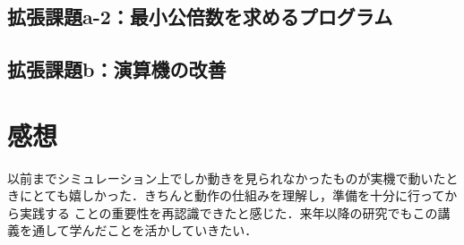 \documentclass[dvipdfmx]{jarticle}
\begin{document}
\subsection{拡張課題a-2：最小公倍数を求めるプログラム}
\subsection{拡張課題b：演算機の改善}
\section{感想}
以前までシミュレーション上でしか動きを見られなかったものが実機で動いたときにとても嬉しかった．きちんと動作の仕組みを理解し，準備を十分に行ってから実践する
ことの重要性を再認識できたと感じた．来年以降の研究でもこの講義を通して学んだことを活かしていきたい．
\end{document}
